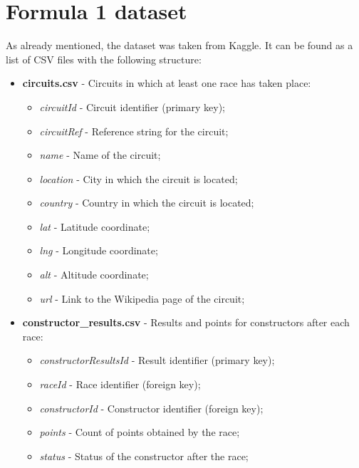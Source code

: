 \documentclass{Configuration_Files/PoliMi3i_thesis}
\begin{document}
\newpage
\section{Formula 1 dataset}
As already mentioned, the dataset was taken from Kaggle. It can be found as a list of CSV files with the following structure:

\begin{itemize}
    \item \textbf{circuits.csv} - Circuits in which at least one race has taken place:
    \begin{itemize}
        \item \textit{circuitId} - Circuit identifier (primary key);
        \item \textit{circuitRef} - Reference string for the circuit;
        \item \textit{name} - Name of the circuit;
        \item \textit{location} - City in which the circuit is located;
        \item \textit{country} - Country in which the circuit is located;
        \item \textit{lat} - Latitude coordinate;
        \item \textit{lng} - Longitude coordinate;
        \item \textit{alt} - Altitude coordinate;
        \item \textit{url} - Link to the Wikipedia page of the circuit;
    \end{itemize}

    \item \textbf{constructor\_results.csv} - Results and points for constructors after each race:
    \begin{itemize}
        \item \textit{constructorResultsId} - Result identifier (primary key);
        \item \textit{raceId} - Race identifier (foreign key);
        \item \textit{constructorId} - Constructor identifier (foreign key);
        \item \textit{points} - Count of points obtained by the race;
        \item \textit{status} - Status of the constructor after the race;
    \end{itemize}


\end{itemize}
\end{document}

